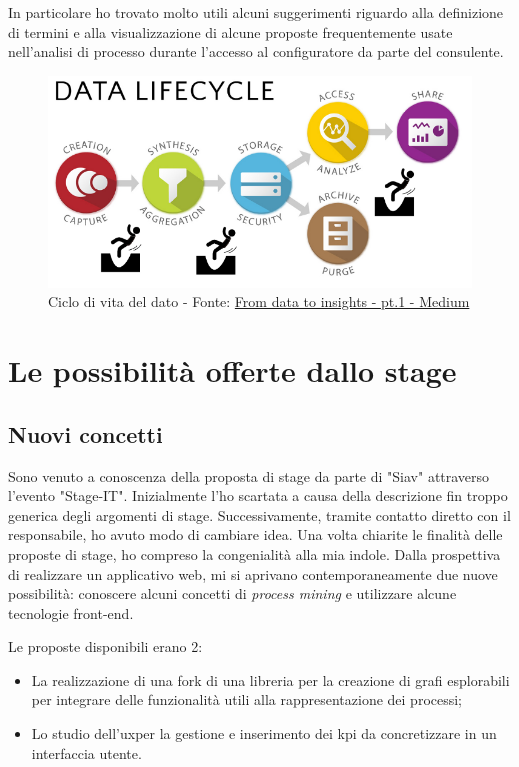 In particolare ho trovato molto utili alcuni suggerimenti riguardo alla definizione di termini e alla visualizzazione di alcune proposte frequentemente usate nell'analisi di processo durante l'accesso al configuratore da parte del consulente.

\begin{figure}[H]
    \centering
    \includegraphics[width=0.80\columnwidth]{immagini/data_lifecycle.png}
    \caption{Ciclo di vita del dato - Fonte: \href{https://medium.com/digital-transformation-in-the-asset-management/from-data-to-insights-the-immediate-pitfalls-part-i-data-creation-collection-7948568c0059}{From data to insights - pt.1 - Medium}}
    \label{fig:dataLifecycle}
\end{figure}
\section{Le possibilità offerte dallo stage}
\subsection{Nuovi concetti}
Sono venuto a conoscenza della proposta di stage da parte di "Siav" attraverso l'evento "Stage-IT". Inizialmente l'ho scartata a causa della descrizione fin troppo generica degli argomenti di stage. Successivamente, tramite contatto diretto con il responsabile, ho avuto modo di cambiare idea. Una volta chiarite le finalità delle proposte di stage, ho compreso la congenialità alla mia indole. Dalla prospettiva di realizzare un applicativo web, mi si aprivano contemporaneamente due nuove possibilità: conoscere alcuni concetti di \textit{process mining} e utilizzare alcune tecnologie front-end.

Le proposte disponibili erano 2:
\begin{itemize}
    \item La realizzazione di una \gls{fork} di una libreria per la creazione di grafi esplorabili per integrare delle funzionalità utili alla rappresentazione dei processi; 
    \item Lo studio dell'\acrshort{ux}\glsfirstoccur per la gestione e inserimento dei \acrshort{kpi} da concretizzare in un interfaccia utente.
\end{itemize}

